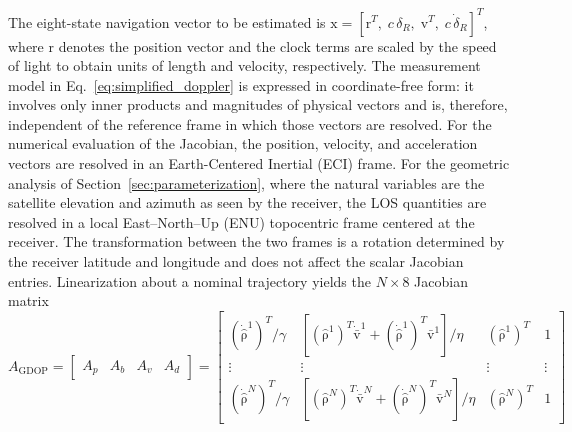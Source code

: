 \documentclass[letterpaper,times]{IONconf-v2}
\theoremstyle{plain}
\theoremstyle{remark}
\renewcommand{\vec}[1]{{\boldsymbol{\mathrm{#1}}}}
\begin{document}
The eight-state navigation vector to be estimated is $\vec{x} = [\vec{r}^T,\; c\,\delta_R,\; \vec{v}^T,\; c\,\dot{\delta}_R]^T$, where $\vec r$ denotes the position vector and the clock terms are scaled by the speed of light to obtain units of length and velocity, respectively. The measurement model in Eq.~\eqref{eq:simplified_doppler} is expressed in coordinate-free form: it involves only inner products and magnitudes of physical vectors and is, therefore, independent of the reference frame in which those vectors are resolved. For the numerical evaluation of the Jacobian, the position, velocity, and acceleration vectors are resolved in an Earth-Centered Inertial (ECI) frame. For the geometric analysis of Section~\ref{sec:parameterization}, where the natural variables are the satellite elevation and azimuth as seen by the receiver, the LOS quantities are resolved in a local East--North--Up (ENU) topocentric frame centered at the receiver. The transformation between the two frames is a rotation determined by the receiver latitude and longitude and does not affect the scalar Jacobian entries. Linearization about a nominal trajectory yields the $N \times 8$ Jacobian matrix \parencite{Psiaki2021}
%
\begin{equation}\label{eq:jacobian}
A_{\mathrm{GDOP}} =
\begin{bmatrix}
    A_p & A_b & A_v & A_d
\end{bmatrix} =
\begin{bmatrix}
(\dot{\hat{\vec\rho}}^1)^T / \gamma
  & [(\hat{\vec\rho}^1)^T \dot{\bar{\vec{v}}}^1
    + (\dot{\hat{\vec\rho}}^1)^T \bar{\vec{v}}^1] / \eta
  & (\hat{\vec\rho}^1)^T & 1 \\
\vdots & \vdots & \vdots & \vdots \\
(\dot{\hat{\vec\rho}}^N)^T / \gamma
  & [(\hat{\vec\rho}^N)^T \dot{\bar{\vec{v}}}^N
    + (\dot{\hat{\vec\rho}}^N)^T \bar{\vec{v}}^N] / \eta
  & (\hat{\vec\rho}^N)^T & 1
\end{bmatrix}
\end{equation}
%
\end{document}
